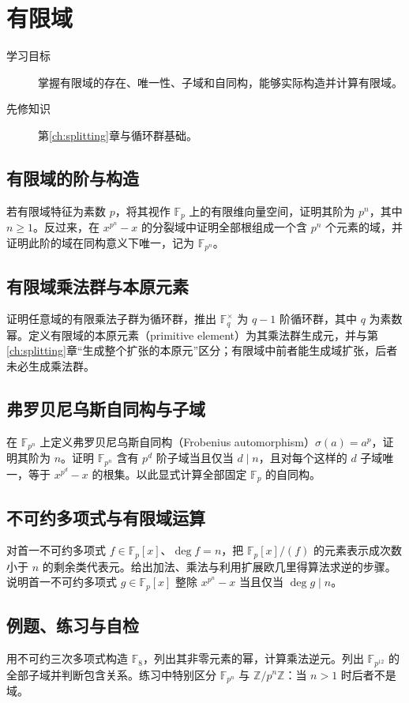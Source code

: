 \documentclass[UTF8,12pt,a4paper,fontset=fandol]{ctexbook}
\begin{document}
\chapter{有限域}\label{ch:finite-fields}

\begin{description}
  \item[学习目标] 掌握有限域的存在、唯一性、子域和自同构，能够实际构造并计算有限域。
  \item[先修知识] 第\ref{ch:splitting}章与循环群基础。
\end{description}

\section{有限域的阶与构造}
若有限域特征为素数 $p$，将其视作 $\mathbb F_p$ 上的有限维向量空间，证明其阶为 $p^n$，其中 $n\geq1$。反过来，在 $x^{p^n}-x$ 的分裂域中证明全部根组成一个含 $p^n$ 个元素的域，并证明此阶的域在同构意义下唯一，记为 $\mathbb F_{p^n}$。

\section{有限域乘法群与本原元素}
证明任意域的有限乘法子群为循环群，推出 $\mathbb F_q^\times$ 为 $q-1$ 阶循环群，其中 $q$ 为素数幂。定义有限域的本原元素（primitive element）为其乘法群生成元，并与第\ref{ch:splitting}章“生成整个扩张的本原元”区分；有限域中前者能生成域扩张，后者未必生成乘法群。

\section{弗罗贝尼乌斯自同构与子域}
在 $\mathbb F_{p^n}$ 上定义弗罗贝尼乌斯自同构（Frobenius automorphism）$\sigma(a)=a^p$，证明其阶为 $n$。证明 $\mathbb F_{p^n}$ 含有 $p^d$ 阶子域当且仅当 $d\mid n$，且对每个这样的 $d$ 子域唯一，等于 $x^{p^d}-x$ 的根集。以此显式计算全部固定 $\mathbb F_p$ 的自同构。

\section{不可约多项式与有限域运算}
对首一不可约多项式 $f\in\mathbb F_p[x]$、$\deg f=n$，把 $\mathbb F_p[x]/(f)$ 的元素表示成次数小于 $n$ 的剩余类代表元。给出加法、乘法与利用扩展欧几里得算法求逆的步骤。说明首一不可约多项式 $g\in\mathbb F_p[x]$ 整除 $x^{p^n}-x$ 当且仅当 $\deg g\mid n$。

\section{例题、练习与自检}
用不可约三次多项式构造 $\mathbb F_8$，列出其非零元素的幂，计算乘法逆元。列出 $\mathbb F_{p^{12}}$ 的全部子域并判断包含关系。练习中特别区分 $\mathbb F_{p^n}$ 与 $\mathbb Z/p^n\mathbb Z$：当 $n>1$ 时后者不是域。
\end{document}
